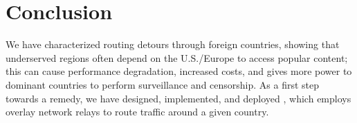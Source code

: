 \section{Conclusion}
\label{conclusion}

We have characterized routing
detours through foreign countries, showing 
that underserved regions often depend on the U.S./Europe to 
access popular content; this can cause performance degradation, increased costs, 
and gives more power to dominant countries to perform surveillance and censorship.   %
As a first step towards a remedy, we have
designed, implemented, and deployed \system{}, which employs overlay network
relays to route traffic around a given country. %

